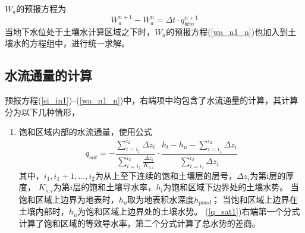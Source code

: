 $W_a$的预报方程为
\begin{equation}\label{wa_n1_n}
W_{a}^{n+1}-W_{a}^{n}=\Delta t \cdot q_{b t m}^{n+1}
\end{equation}
当地下水位处于土壤水计算区域之下时，$W_a$的预报方程(\ref{wa_n1_n})也加入到土壤水的方程组中，进行统一求解。

\subsection{水流通量的计算}
预报方程(\ref{si_in1})--(\ref{wa_n1_n})中，右端项中均包含了水流通量的计算，其计算分为以下几种情形，
\begin{enumerate}
    \item 饱和区域内部的水流通量，使用公式
    \begin{equation}\label{q_sat1}
        q_{sat}=-\frac{\sum_{i=i_{1}}^{i_{2}} \Delta z_{i}}{\sum_{i=i_{1}}^{i_{2}} \frac{\Delta z_{i}}{K_{s, i}}}
         \cdot \frac{h_{l}-h_{u}-\sum_{i=i_{1}}^{i_{2}} \Delta z_{i}}{\sum_{i=i_{1}}^{i_{2}} \Delta z_{i}}
        \end{equation}
        其中，$i_1,i_1+1,…,i_2$为从上至下连续的饱和土壤层的层号，$\Delta z_i$为第i层的厚度，
        $K_{s,i}$为第$i$层的饱和土壤导水率，$h_l$为饱和区域下边界处的土壤水势。
        当饱和区域上边界为地表时，$h_u$取为地表积水深度$h_{pond}$；
        当饱和区域上边界在土壤内部时，$h_u$为饱和区域上边界处的土壤水势。
        (\ref{q_sat1})右端第一个分式计算了饱和区域的等效导水率，第二个分式计算了总水势的差商。


\end{enumerate}
